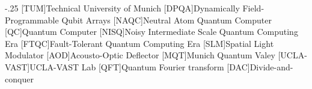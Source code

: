 \documentclass[headsepline,footsepline,footinclude=false,oneside,fontsize=11pt,paper=a4,listof=totoc,bibliography=totoc]{scrbook} %
\begin{document}


\frontmatter{}





\tableofcontents{}

\mainmatter{}






\appendix{}


\begin{acronym}
	\itemsep-.25\baselineskip
	[TUM]{Technical University of Munich}
	[DPQA]{Dynamically Field-Programmable Qubit Arrays}
	[NAQC]{Neutral Atom Quantum Computer}
	[QC]{Quantum Computer}
	[NISQ]{Noisy Intermediate Scale Quantum Computing Era}
	[FTQC]{Fault-Tolerant Quantum Computing Era}
	[SLM]{Spatial Light Modulator}
	[AOD]{Acousto-Optic Deflector}
	[MQT]{Munich Quantum Valey}
	[UCLA-VAST]{UCLA-VAST Lab}
	[QFT]{Quantum Fourier transform}
	[DAC]{Divide-and-conquer}
\end{acronym}

\listoffigures{}
\listoftables{}
\printbibliography{}
\end{document}
